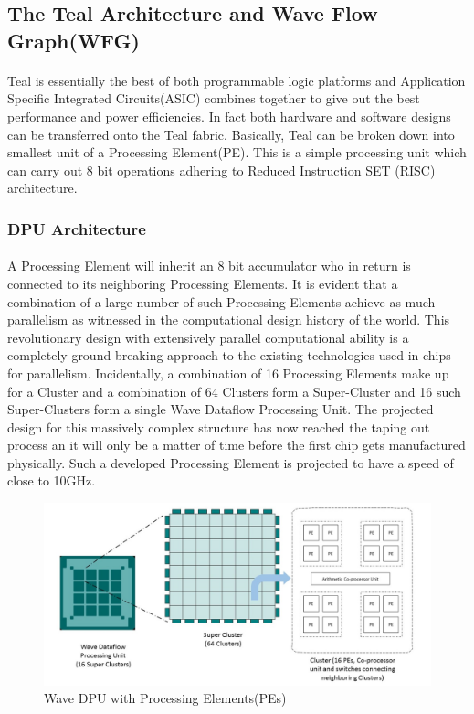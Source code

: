 
\newpage
\subsection{The Teal Architecture and Wave Flow Graph(WFG)}
\paragraph{}
Teal is essentially the best of both programmable logic platforms and Application Specific Integrated Circuits(ASIC) combines together to give out the best performance and power efficiencies. In fact both hardware and software designs can be transferred onto the Teal fabric. Basically, Teal can be broken down into smallest unit of a Processing Element(PE). This is a simple processing unit which can carry out 8 bit operations adhering to Reduced Instruction SET (RISC) architecture.

\subsubsection{DPU Architecture}
\paragraph{}
A Processing Element will inherit an 8 bit accumulator who in return is connected to its neighboring Processing Elements. It is evident that a combination of a large number of such Processing Elements achieve as much parallelism as witnessed in the computational design history of the world. This revolutionary design with extensively parallel computational ability is a completely ground-breaking approach to the existing technologies used in chips for parallelism. Incidentally, a combination of 16 Processing Elements make up for a Cluster and a combination of 64 Clusters form a Super-Cluster and 16 such Super-Clusters form a single Wave Dataflow Processing Unit. The projected design for this massively complex structure has now reached the taping out process an it will only be a matter of time before the first chip gets manufactured physically. Such a developed Processing Element is projected to have a speed of close to 10GHz.

\begin{figure}[H]
    \centering
    \includegraphics[trim=0cm 0cm 0cm 0cm, clip=true,scale=0.5]{figures/dpu_struct.jpg}
    \caption{Wave DPU with Processing Elements(PEs)\label{Fig:dpustruct}}\vspace{-4mm}
    \end{figure}

